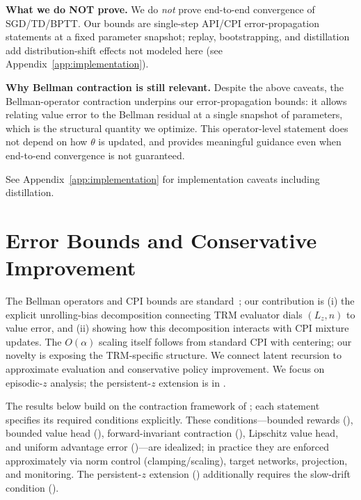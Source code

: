 \documentclass{article}
\theoremstyle{plain}
\theoremstyle{definition}
\theoremstyle{remark}
\newcommand{\shortonly}[1]{#1}
\newcommand{\longonly}[1]{}
\newcommand{\shortonly}[1]{}
\newcommand{\longonly}[1]{#1}
\newcommand{\Cdrift}{C_{\mathrm{drift}}}
\begin{document}
\textbf{What we do NOT prove.}
We do \emph{not} prove end-to-end convergence of SGD/TD/BPTT.
Our bounds are single-step API/CPI error-propagation statements at a fixed parameter snapshot; replay, bootstrapping, and distillation add distribution-shift effects not modeled here (see Appendix~\ref{app:implementation}).

\textbf{Why Bellman contraction is still relevant.}
Despite the above caveats, the Bellman-operator contraction\longonly{ (Lemma~\ref{lem:Kstep_contraction})} underpins our error-propagation bounds: it allows relating value error to the Bellman residual at a single snapshot of parameters, which is the structural quantity we optimize.
This operator-level statement does not depend on how $\theta$ is updated, and provides meaningful guidance even when end-to-end convergence is not guaranteed.

See Appendix~\ref{app:implementation} for implementation caveats including distillation.

\section{Error Bounds and Conservative Improvement}
\label{sec:error_bounds}

The Bellman operators and CPI bounds are standard~\citep{KakadeLangford2002}; our contribution is (i) the explicit unrolling-bias decomposition connecting TRM evaluator dials $(L_z, n)$ to value error, and (ii) showing how this decomposition interacts with CPI mixture updates. The $O(\alpha)$ scaling itself follows from standard CPI with centering; our novelty is exposing the TRM-specific structure.
We connect latent recursion to approximate evaluation and conservative policy improvement.
\shortonly{We focus on episodic-$z$ analysis; the persistent-$z$ extension is in \Cref{app:persistent_latent}.}
\longonly{\textbf{Sections~\ref{sec:value_error_bounds}--\ref{sec:cpi} present the episodic-$z$ analysis; \Cref{sec:persistent_extension} extends to persistent-$z$ via $\Cdrift(n)$.}}

The results below build on the contraction framework of ; each statement specifies its required conditions explicitly.
These conditions---bounded rewards (), bounded value head (), forward-invariant contraction (), Lipschitz value head, and uniform advantage error ()---are idealized; in practice they are enforced approximately via norm control (clamping/scaling), target networks, projection, and monitoring.
The persistent-$z$ extension () additionally requires the slow-drift condition ().
\end{document}
